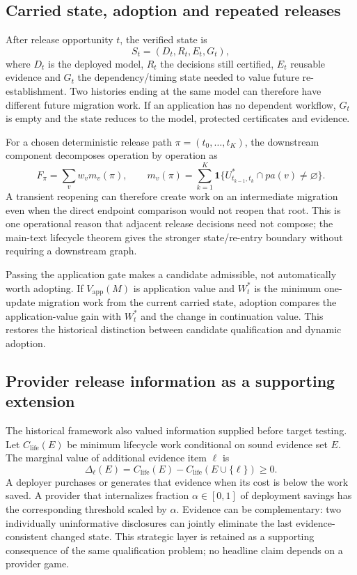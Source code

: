 \documentclass[11pt,letterpaper]{article}
\theoremstyle{plain}
\newcommand{\1}{\mathbf 1}
\begin{document}
\subsection{Carried state, adoption and repeated releases}
After release opportunity $t$, the verified state is
\begin{equation}
S_t=(D_t,R_t,E_t,G_t),
\label{eq:s_carried_state}
\end{equation}
where $D_t$ is the deployed model, $R_t$ the decisions still certified, $E_t$ reusable evidence and $G_t$ the dependency/timing state needed to value future re-establishment. Two histories ending at the same model can therefore have different future migration work. If an application has no dependent workflow, $G_t$ is empty and the state reduces to the model, protected certificates and evidence.

For a chosen deterministic release path $\pi=(t_0,\ldots,t_K)$, the downstream component decomposes operation by operation as
\begin{equation}
F_\pi=\sum_v w_v m_v(\pi),\qquad
m_v(\pi)=\sum_{k=1}^{K}\mathbf 1\{U^*_{t_{k-1},t_k}\cap pa(v)\neq\varnothing\}.
\label{eq:s_path_downstream}
\end{equation}
A transient reopening can therefore create work on an intermediate migration even when the direct endpoint comparison would not reopen that root. This is one operational reason that adjacent release decisions need not compose; the main-text lifecycle theorem gives the stronger state/re-entry boundary without requiring a downstream graph.

Passing the application gate makes a candidate admissible, not automatically worth adopting. If $V_{\mathrm{app}}(M)$ is application value and $W_t^*$ is the minimum one-update migration work from the current carried state, adoption compares the application-value gain with $W_t^*$ and the change in continuation value. This restores the historical distinction between candidate qualification and dynamic adoption.

\subsection{Provider release information as a supporting extension}
The historical framework also valued information supplied before target testing. Let $C_{\mathrm{life}}(E)$ be minimum lifecycle work conditional on sound evidence set $E$. The marginal value of additional evidence item $\ell$ is
\begin{equation}
\Delta_\ell(E)=C_{\mathrm{life}}(E)-C_{\mathrm{life}}(E\cup\{\ell\})\ge0.
\label{eq:s_provider_value}
\end{equation}
A deployer purchases or generates that evidence when its cost is below the work saved. A provider that internalizes fraction $\alpha\in[0,1]$ of deployment savings has the corresponding threshold scaled by $\alpha$. Evidence can be complementary: two individually uninformative disclosures can jointly eliminate the last evidence-consistent changed state. This strategic layer is retained as a supporting consequence of the same qualification problem; no headline claim depends on a provider game.
\end{document}
